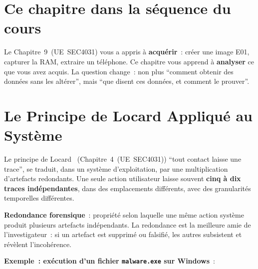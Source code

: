 \section*{Ce chapitre dans la séquence du cours}

Le Chapitre~9~(UE~SEC4031) vous a appris à \textbf{acquérir}~: créer
une image E01, capturer la RAM, extraire un téléphone. Ce chapitre vous
apprend à \textbf{analyser} ce que vous avez acquis. La question change~:
non plus ``comment obtenir des données sans les altérer'', mais
``que disent ces données, et comment le prouver''.

\separateur

\section{Le Principe de Locard Appliqué au Système}
\label{sec:locard-systeme}

Le principe de Locard~\cite{locard1920} (Chapitre~4~(UE~SEC4031)) ``tout contact
laisse une trace'', se traduit, dans un système d'exploitation, par
une multiplication d'artefacts redondants. Une seule action utilisateur
laisse souvent \textbf{cinq à dix traces indépendantes}, dans des
emplacements différents, avec des granularités temporelles différentes.

\begin{boxdef}
\textbf{Redondance forensique}~: propriété
selon laquelle une même action système produit plusieurs artefacts
indépendants. La redondance est la meilleure amie de l'investigateur~:
si un artefact est supprimé ou falsifié, les autres subsistent et
révèlent l'incohérence.
\end{boxdef}

\textbf{Exemple~: exécution d'un fichier \texttt{malware.exe} sur Windows}~:

